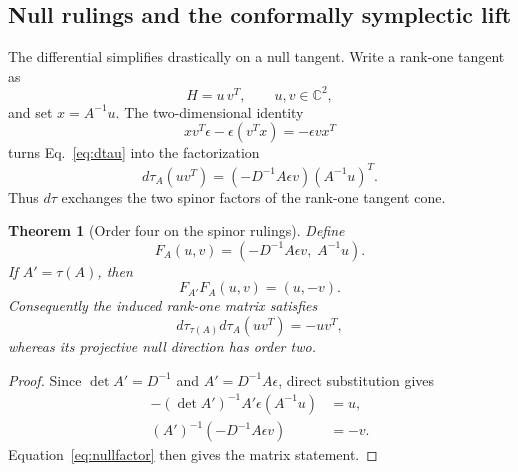 \documentclass[11pt]{article}
\newtheorem{theorem}{Theorem}[section]
\theoremstyle{definition}\newtheorem{definition}[theorem]{Definition}
\theoremstyle{remark}\newtheorem{remark}[theorem]{Remark}\newtheorem{conjecture}[theorem]{Conjecture}
\begin{document}
\subsection{Null rulings and the conformally symplectic lift}

The differential simplifies drastically on a null tangent. Write a rank-one tangent as
\begin{equation}
 H=u\,v^T,\qquad u,v\in\mathbb C^2,
\end{equation}
and set $x=A^{-1}u$. The two-dimensional identity
\begin{equation}
 x v^T\epsilon-\epsilon(v^Tx)=-\epsilon v x^T
\end{equation}
turns Eq.~\eqref{eq:dtau} into the factorization
\begin{equation}\label{eq:nullfactor}
 \boxed{
 d\tau_A(uv^T)
 =
 \left(-D^{-1}A\epsilon v\right)
 \left(A^{-1}u\right)^T.}
\end{equation}
Thus $d\tau$ exchanges the two spinor factors of the rank-one tangent cone.

\begin{theorem}[Order four on the spinor rulings]\label{thm:rulingswap}
Define
\begin{equation}
 F_A(u,v)=\left(-D^{-1}A\epsilon v,\;A^{-1}u\right).
\end{equation}
If $A'=\tau(A)$, then
\begin{equation}\label{eq:Fcompose}
 \boxed{F_{A'}F_A(u,v)=(u,-v).}
\end{equation}
Consequently the induced rank-one matrix satisfies
\begin{equation}
 d\tau_{\tau(A)}d\tau_A(uv^T)=-uv^T,
\end{equation}
whereas its projective null direction has order two.
\end{theorem}

\begin{proof}
Since $\det A'=D^{-1}$ and $A'=D^{-1}A\epsilon$, direct substitution gives
\begin{align}
 -(\det A')^{-1}A'\epsilon(A^{-1}u)&=u,\\
 (A')^{-1}\left(-D^{-1}A\epsilon v\right)&=-v.
\end{align}
Equation~\eqref{eq:nullfactor} then gives the matrix statement.
\end{proof}
\end{document}
